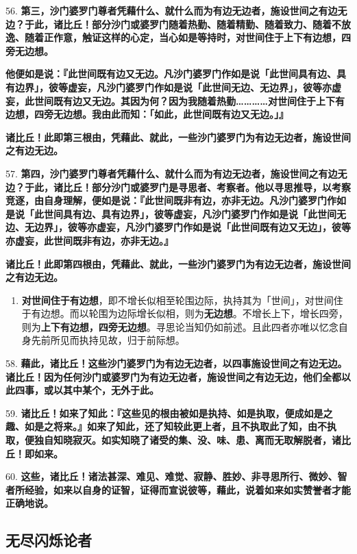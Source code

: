 {\Large 56.} \textbf{第三，沙门婆罗门尊者凭藉什么、就什么而为有边无边者，施设世间之有边无边？于此，诸比丘！部分沙门或婆罗门随着热勤、随着精勤、随着致力、随着不放逸、随着正作意，触证这样的心定，当心如是等持时，对世间住于上下有边想，四旁无边想。}

\textbf{他便如是说：『此世间既有边又无边。凡沙门婆罗门作如是说「此世间具有边、具有边界」，彼等虚妄，凡沙门婆罗门作如是说「此世间无边、无边界」，彼等亦虚妄，此世间既有边又无边。其因为何？因为我随着热勤…………对世间住于上下有边想，四旁无边想。我由此而知：「如此，此世间既有边又无边。」』}

\textbf{诸比丘！此即第三根由，凭藉此、就此，一些沙门婆罗门为有边无边者，施设世间之有边无边。}

{\Large 57.} \textbf{第四，沙门婆罗门尊者凭藉什么、就什么而为有边无边者，施设世间之有边无边？于此，诸比丘！部分沙门或婆罗门是寻思者、考察者。他以寻思推导，以考察竞逐，由自身理解，便如是说：『此世间既非有边，亦非无边。凡沙门婆罗门作如是说「此世间具有边、具有边界」，彼等虚妄，凡沙门婆罗门作如是说「此世间无边、无边界」，彼等亦虚妄，凡沙门婆罗门作如是说「此世间既有边又无边」，彼等亦虚妄，此世间既非有边，亦非无边。』}

\textbf{诸比丘！此即第四根由，凭藉此、就此，一些沙门婆罗门为有边无边者，施设世间之有边无边。}

\begin{enumerate}\item \textbf{对世间住于有边想}，即不增长似相至轮围边际，执持其为「世间」，对世间住于有边想。而以轮围为边际增长似相，则为\textbf{无边想}。不增长上下，增长四旁，则为\textbf{上下有边想，四旁无边想}。寻思论当知仍如前述。且此四者亦唯以忆念自身先前所见而执持见故，归于前际想。\end{enumerate}

{\Large 58.} \textbf{藉此，诸比丘！这些沙门婆罗门为有边无边者，以四事施设世间之有边无边。诸比丘！因为任何沙门或婆罗门为有边无边者，施设世间之有边无边，他们全都以此四事，或以其中某个，无外于此。}

{\Large 59.} \textbf{诸比丘！如来了知此：『这些见的根由被如是执持、如是执取，便成如是之趣、如是之将来。』如来了知此，还了知较此更上者，且不执取此了知，由不执取，便独自知晓寂灭。如实知晓了诸受的集、没、味、患、离而无取解脱者，诸比丘！即如来。}

{\Large 60.} \textbf{这些，诸比丘！诸法甚深、难见、难觉、寂静、胜妙、非寻思所行、微妙、智者所经验，如来以自身的证智，证得而宣说彼等，藉此，说着如来如实赞誉者才能正确地说。}

\subsection{无尽闪烁论者}

